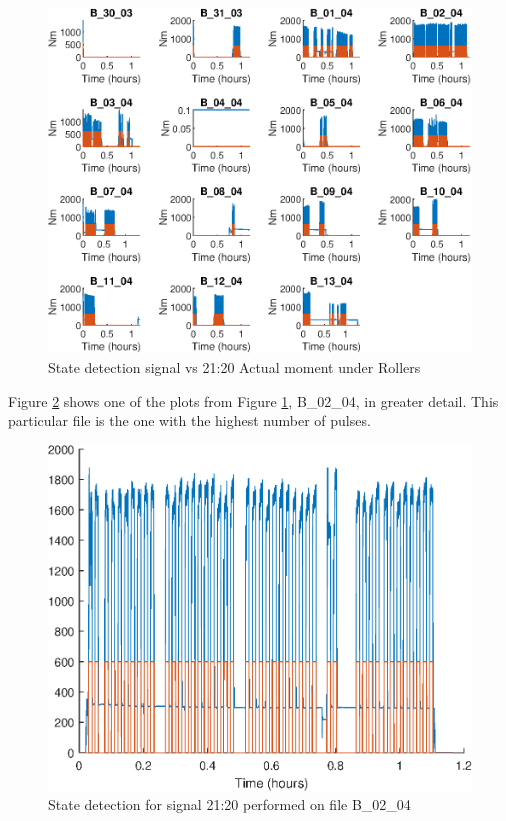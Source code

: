 \documentclass{article}
\begin{document}
\begin{figure}[H]
    \centering
    \includegraphics[width=\textwidth, height=\textheight, keepaspectratio]{figures/StateDetectionFig.eps}
    \caption{State detection signal vs 21:20 Actual moment under Rollers}
    \label{fig:StateDetection}
\end{figure}

Figure \ref{fig:StateDetectionFig_B_02_04} shows one of the plots from Figure \ref{fig:StateDetection}, B\_02\_04, in greater detail. This particular file is the one with the highest number of pulses.

\begin{figure}[H]
    \centering
    \includegraphics[scale=0.75]{figures/StateDetectionFig_B_02_04.eps}
    \caption{State detection for signal 21:20 performed on file B\_02\_04}
    \label{fig:StateDetectionFig_B_02_04}
\end{figure}
\end{document}
